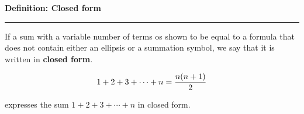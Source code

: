\nopagenumbers
{\bf Definition: Closed form}
\vskip 1mm
\hrule

\vskip 6pt
If a sum with a variable number of terms os shown to be equal to a formula that does not contain either an ellipsis or a summation symbol, we say that it is written in {\bf closed form}.

$$1+2+3+\cdots+n={n(n+1)\over 2}$$

expresses the sum $1+2+3+\cdots+n$ in closed form.



\vfill\eject
